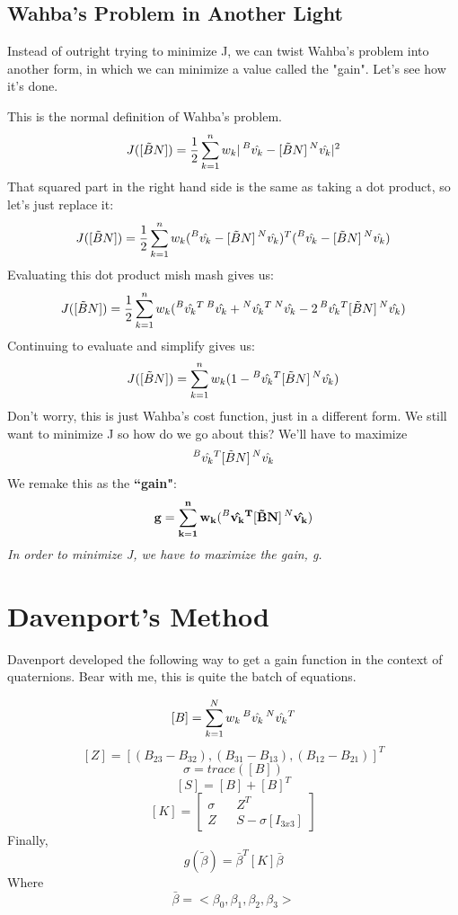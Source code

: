 \documentclass[a4paper,14pt]{extreport}
\newcommand{\vk}[1]{\prescript{#1}{}{\hat{v_k}}}
\begin{document}
\subsection{Wahba's Problem in Another Light}
Instead of outright trying to minimize J, we can twist Wahba's problem into another form, in which we can minimize a value called the "gain". Let's see how it's done. 

This is the normal definition of Wahba's problem.
\[
J([\tilde{B}N]) = \dfrac{1}{2} \sum^n_{k=1} w_k |\vk{B} - [\tilde{B}N]\vk{N}|^2
\]
That squared part in the right hand side is the same as taking a dot product, so let's just replace it:
\[
J([\tilde{B}N]) = \dfrac{1}{2} \sum^n_{k=1} w_k (\vk{B} - [\tilde{B}N]\vk{N})^T(\vk{B} - [\tilde{B}N]\vk{N})
\]
Evaluating this dot product mish mash gives us:
\[
J([\tilde{B}N]) = \dfrac{1}{2} \sum^n_{k=1} w_k (\vk{B}^T\vk{B}+\vk{N}^T\vk{N}-2\vk{B}^T[\tilde{B}N]\vk{N})
\]
Continuing to evaluate and simplify gives us:
\[
J([\tilde{B}N]) = \sum^n_{k=1} w_k (1- \vk{B}^T[\tilde{B}N]\vk{N})
\]
Don't worry, this is just Wahba's cost function, just in a different form. We still want to minimize J so how do we go about this? We'll have to maximize $$\vk{B}^T[\tilde{B}N]\vk{N}$$ We remake this as the \textbf{``gain"}:
\[
\mathbf{
g = \sum^n_{k=1} w_k (\vk{B}^T[\tilde{B}N]\vk{N})}
\]
\emph{In order to minimize J, we have to maximize the gain, g.}

\section{Davenport's Method}
Davenport developed the following way to get a gain function in the context of quaternions. Bear with me, this is quite the batch of equations.

\[
[B] = \sum^N_{k=1} w_k\vk{B}\vk{N}^T
\]
\[
[Z] = [(B_{23}-B_{32}), (B_{31}-B_{13}), (B_{12}-B_{21})]^T
\]
\[
\sigma = trace([B])
\]
\[
[S] = [B]+[B]^T
\]
\[
[K] =
\begin{bmatrix}
\sigma && Z^T \\ Z && S-\sigma  [I_{3x3}]
\end{bmatrix}
\]
Finally,
\[
g(\tilde{\beta}) = \bar{\beta}^T[K]\bar{\beta}
\]
Where
\[\bar{\beta} = <\beta_0,\beta_1,\beta_2,\beta_3>\]
\end{document}
